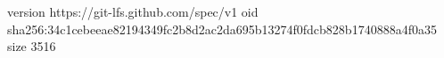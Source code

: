 version https://git-lfs.github.com/spec/v1
oid sha256:34c1cebeeae82194349fc2b8d2ac2da695b13274f0fdcb828b1740888a4f0a35
size 3516
